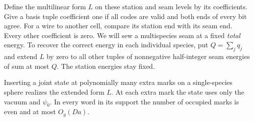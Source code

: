 Define the multilinear form $L$ on these station and seam levels by
its coefficients. Give a basis tuple coefficient one if all codes are
valid and both ends of every bit agree. For a wire to another cell,
compare its station end with its seam end. Every other coefficient
is zero. We will sew a multispecies seam at a fixed \emph{total}
energy. To recover the correct energy in each individual species,
put $Q=\sum_j q_j$ and extend $L$ by zero to all other tuples of
nonnegative half-integer seam energies of sum at most $Q$. The station
energies stay fixed.

\begin{lemma}\label{lem:plant-probes}
Inserting a joint state at polynomially many extra marks on a
single-species sphere realizes the extended form $L$. At each extra
mark the state uses only the vacuum and $\psi_0$. In every word in its
support the number of occupied marks is even and at most $O_g(Da)$.
\end{lemma}
